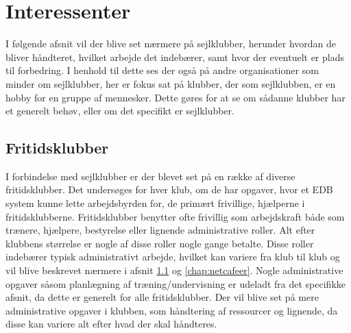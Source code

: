 \chapter{Interessenter}

I følgende afsnit vil der blive set nærmere på sejlklubber, herunder hvordan de bliver håndteret, hvilket arbejde det
indebærer, samt hvor der eventuelt er plads til forbedring. I henhold til dette ses der også på andre organisationer
som minder om sejlklubber, her er fokus sat på klubber, der som sejlklubben, er en hobby for en gruppe af mennesker.
Dette gøres for at se om sådanne klubber har et generelt behøv, eller om det specifikt er sejlklubber.


\section{Fritidsklubber} \label{Fritidsklub}

I forbindelse med sejlklubber er der blevet set på en række af diverse fritidsklubber. Det undersøges for hver klub, om
de har opgaver, hvor et EDB system kunne lette arbejdsbyrden for, de primært frivillige, hjælperne i fritidsklubberne.
Fritidsklubber benytter ofte frivillig som arbejdskraft både som trænere, hjælpere, bestyrelse eller lignende
administrative roller. Alt efter klubbens størrelse er nogle af disse roller nogle gange betalte. Disse roller indebærer
typisk administrativt arbejde, hvilket kan variere fra klub til klub og vil blive beskrevet nærmere i afsnit
\ref{Fritidsklub} og  \ref{chap:netcafeer}. Nogle administrative opgaver såsom planlægning af træning/undervisning er
udeladt fra det specifikke afsnit, da dette er generelt for alle fritidsklubber. Der vil  blive set på mere
administrative opgaver i klubben, som håndtering af ressourcer og lignende, da disse kan variere alt efter hvad der skal
håndteres.

%
%


